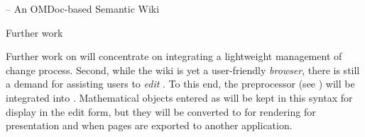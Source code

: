 \begin{omgroup}[id=swim,creators={clange,miko}]{{\swim} -- An OMDoc-based Semantic Wiki}
\begin{omgroup}{Further work}

Further work on {\swim} will concentrate on integrating a lightweight
management of change process.  Second, while the wiki is yet a user-friendly
\emph{browser}, there is still a demand for assisting users to \emph{edit}
{\omdoc}.  To this end, the {\qmath} preprocessor (see {}) will
be integrated into {\swim}.  Mathematical objects entered as {\qmath} will be
kept in this syntax for display in the edit form, but they will be converted to
{\omdoc} for rendering for presentation and when pages are exported to another
application.
\end{omgroup}
\end{omgroup}

